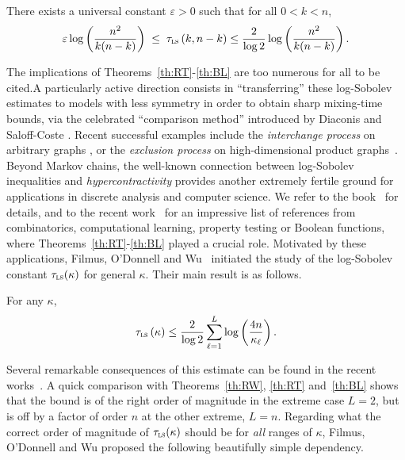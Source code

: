 \documentclass[AHL,Unicode,longabstracts,published]{cedram}
\newcommand{\tls}{\tau_{\textsc{ls}}}
\begin{document}
\begin{theo}\label{th:BL}
There exists a universal constant $\varepsilon>0$ such that for all $0< k< n$,
\[
\varepsilon \log \left(\frac{n^2}{k(n-k)}\right)\; \le \; \tls\left(k,n-k\right) \le \frac{2}{\log 2} \log \left(\frac{n^2}{k(n-k)}\right).
\]

\end{theo}

The implications of Theorems~\ref{th:RT}-\ref{th:BL} are too numerous for all to be cited.\linebreak A particularly active direction consists in ``transferring'' these log-Sobolev estimates to models with less symmetry in order to obtain sharp mixing-time bounds, via the celebrated ``comparison method'' introduced by Diaconis and Saloff-Coste \cite{MR1245303,MR1233621}. Recent successful examples include the \emph{interchange process} on arbitrary graphs \cite{2018arXiv181110537A}, or the \emph{exclusion process} on high-dimensional product graphs~\cite{2019arXiv190502146H}. Beyond Markov chains, the well-known connection between log-Sobolev inequalities and \emph{hypercontractivity} provides another extremely fertile ground for applications in discrete analysis and computer science. We refer to the book~\cite[Chapters~9 \&~10]{MR3443800} for details, and to the recent work~\cite{2018arXiv180903546F} for an impressive list of references from combinatorics, computational learning, property testing or Boolean functions, where Theorems~\ref{th:RT}-\ref{th:BL} played a crucial role. Motivated by these applications, {Filmus}, {O'Donnell} and {Wu}~\cite{2018arXiv180903546F} initiated the study of the log-Sobolev constant $\tls(\kappa)$ for general $\kappa$. Their main result is as follows.

\begin{theo}\label{th:F}
For any $\kappa$,
\[
\tls\left(\kappa\right) \le \frac{2}{\log 2} \sum_{\ell=1}^L \log \left(\frac{4n}{\kappa_\ell}\right).
\]
\end{theo}

Several remarkable consequences of this estimate can be found in the recent works~\cite{2018arXiv180903546F,MR4079633}. A quick comparison with Theorems~\ref{th:RW}, \ref{th:RT} and~\ref{th:BL} shows that the bound is of the right order of magnitude in the extreme case $L=2$, but is off by a factor of order $n$ at the other extreme, $L=n$. Regarding what the correct order of magnitude of $\tls(\kappa)$ should be for \emph{all} ranges of $\kappa$, {Filmus}, {O'Donnell} and {Wu} proposed the following beautifully simple dependency.
\end{document}
